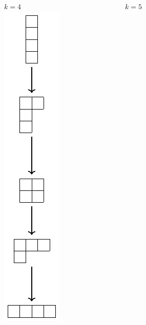 \documentclass[
    9pt,
    hyperref={bookmarks=false, colorlinks=false}, %
    xcolor={dvipsnames},
]{beamer}
\begin{document}
\begin{frame}
\begin{columns}
\begin{column}{0.25\textwidth}
        \end{column}
        \begin{column}{0.25\textwidth}
            \begin{center}
                $k=4$ \\
                \includegraphics[scale=0.4]{figures/majorization_k_4.pdf}
            \end{center}
        \end{column}
        \begin{column}{0.25\textwidth}
            \begin{center}
                $k=5$ \\

\end{center}
\end{column}
\end{columns}
\end{frame}
\end{document}
